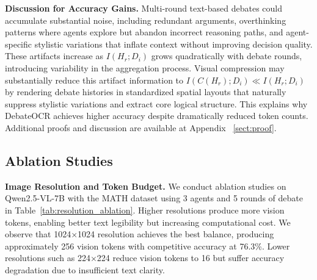 \documentclass{article}
\theoremstyle{plain}
\theoremstyle{definition}
\theoremstyle{remark}
\begin{document}
\textbf{Discussion for Accuracy Gains.}
Multi-round text-based debates could accumulate substantial noise, including redundant arguments, overthinking patterns where agents explore but abandon incorrect reasoning paths, and agent-specific stylistic variations that inflate context without improving decision quality. These artifacts increase as $I(H_r; D_i)$ grows quadratically with debate rounds, introducing variability in the aggregation process. Visual compression may substantially reduce this artifact information to $I(C(H_r); D_i) \ll I(H_r; D_i)$ by rendering debate histories in standardized spatial layouts that naturally suppress stylistic variations and extract core logical structure. This explains why DebateOCR achieves 
higher accuracy despite dramatically reduced token counts. Additional proofs and discussion are available at Appendix ~\ref{sect:proof}.

\subsection{Ablation Studies}
\label{subsec:ablation_studies}

\textbf{Image Resolution and Token Budget.}
We conduct ablation studies on Qwen2.5-VL-7B with the MATH dataset using 3 agents and 5 
rounds of debate in Table~\ref{tab:resolution_ablation}. Higher resolutions produce more vision tokens, enabling better text legibility but increasing computational cost. We observe that 1024×1024 resolution achieves the best balance, producing approximately 256 vision tokens with competitive accuracy at 76.3\%. Lower resolutions such as 224×224 reduce vision tokens to 16 but suffer accuracy degradation due to insufficient text clarity. 


\end{document}
